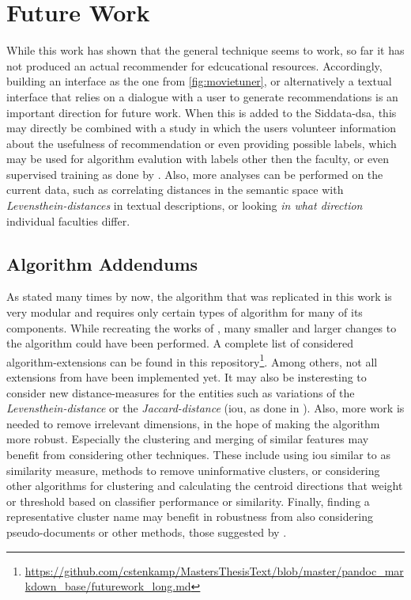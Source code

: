 
\section{Future Work}
\label{sec:futurework}

While this work has shown that the general technique seems to work, so far it has not produced an actual recommender for edcucational resources. Accordingly, building an interface as \eg the one from \autoref{fig:movietuner}, or alternatively a textual interface that relies on a dialogue with a user to generate recommendations is an important direction for future work. When this is added to the Siddata-\gls{dsa}, this may directly be combined with a study in which the users volunteer information about the usefulness of recommendation or even providing possible labels, which may be used for algorithm evalution with labels other then the faculty, or even supervised training as done \eg by \cite{VISR12}. Also, more analyses can be performed on the current data, such as correlating distances in the semantic space with \textit{Levensthein-distances} in textual descriptions, or looking \textit{in what direction} individual faculties differ.

\subsection*{Algorithm Addendums}  As stated many times by now, the algorithm that was replicated in this work is very modular and requires only certain types of algorithm for many of its components. While recreating the works of \mainalgos, many smaller and larger changes to the algorithm could have been performed. A complete list of considered algorithm-extensions can be found in this repository\footnote{\url{https://github.com/cstenkamp/MastersThesisText/blob/master/pandoc_markdown_base/futurework_long.md}}. Among others, not all extensions from \cite{Ager2018, Alshaikh2020} have been implemented yet. It may also be insteresting to consider new distance-measures for the entities such as variations of the \textit{Levensthein-distance} or the \textit{Jaccard-distance} (\eg \gls{iou}, as done in \cite{Schockaert2011}). Also, more work is needed to remove irrelevant dimensions, in the hope of making the algorithm more robust. Especially the clustering and merging of similar features may benefit from considering other techniques. These include using \gls{iou} similar to \cite{Alshaikh2019} as similarity measure, methods to remove uninformative clusters, or considering other algorithms for clustering and calculating the centroid directions that weight or threshold based on classifier performance or similarity. Finally, finding a representative cluster name may benefit in robustness from also considering pseudo-documents \cite{VISR12} or other methods, \eg those suggested by \textcite{Carmel2009}.

